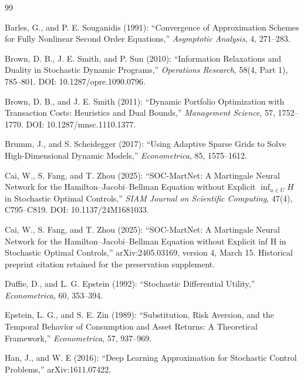 \begin{thebibliography}{99}

 Barles, G., and P. E. Souganidis (1991): ``Convergence of Approximation Schemes for Fully Nonlinear Second Order Equations,'' \emph{Asymptotic Analysis}, 4, 271--283.

 Brown, D. B., J. E. Smith, and P. Sun (2010): ``Information Relaxations and Duality in Stochastic Dynamic Programs,'' \emph{Operations Research}, 58(4, Part 1), 785--801. DOI: 10.1287/opre.1090.0796.

 Brown, D. B., and J. E. Smith (2011): ``Dynamic Portfolio Optimization with Transaction Costs: Heuristics and Dual Bounds,'' \emph{Management Science}, 57, 1752--1770. DOI: 10.1287/mnsc.1110.1377.

 Brumm, J., and S. Scheidegger (2017): ``Using Adaptive Sparse Grids to Solve High-Dimensional Dynamic Models,'' \emph{Econometrica}, 85, 1575--1612.

 Cai, W., S. Fang, and T. Zhou (2025): ``SOC-MartNet: A Martingale Neural Network for the Hamilton--Jacobi--Bellman Equation without Explicit $\inf_{u\in U}H$ in Stochastic Optimal Controls,'' \emph{SIAM Journal on Scientific Computing}, 47(4), C795--C819. DOI: 10.1137/24M1681033.

 Cai, W., S. Fang, and T. Zhou (2025): ``SOC-MartNet: A Martingale Neural Network for the Hamilton--Jacobi--Bellman Equation without Explicit inf H in Stochastic Optimal Controls,'' arXiv:2405.03169, version 4, March 15. Historical preprint citation retained for the preservation supplement.

 Duffie, D., and L. G. Epstein (1992): ``Stochastic Differential Utility,'' \emph{Econometrica}, 60, 353--394.

 Epstein, L. G., and S. E. Zin (1989): ``Substitution, Risk Aversion, and the Temporal Behavior of Consumption and Asset Returns: A Theoretical Framework,'' \emph{Econometrica}, 57, 937--969.

 Han, J., and W. E (2016): ``Deep Learning Approximation for Stochastic Control Problems,'' arXiv:1611.07422.


\end{thebibliography}
